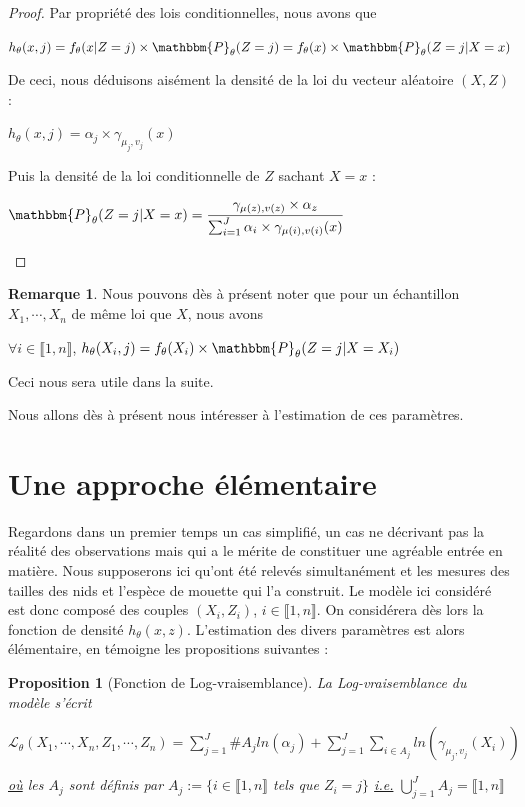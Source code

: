 \documentclass[frenchb]{report}
\newcommand{\1}{\mathbbm{1}}
\newcommand{\prob}{\mathbbm{P}}
\newtheorem{prop}{Proposition}
\theoremstyle{definition}\newtheorem{defn}{Définition}
\theoremstyle{definition}\newtheorem{exm}{Exemple}
\theoremstyle{definition}\newtheorem{nota}{Notation}
\theoremstyle{definition}\newtheorem{rem}{Remarque}
\begin{document}
\begin{proof}
Par propriété des lois conditionnelles, nous avons que  
\begin{center} $h_\theta(x,j) = f_\theta(x | Z = j)\times \prob_\theta(Z = j) = f_\theta(x)\times\prob_\theta(Z = j | X = x)$ \end{center}
De ceci, nous déduisons aisément la densité de la loi du vecteur aléatoire $(X,Z)$ : 
\begin{center} $h_\theta(x,j) = \alpha_j\times\gamma_{\mu_j, v_j}(x)$ \end{center}
Puis la densité de la loi conditionnelle de $Z$ sachant $X = x$ :
\begin{center}
$\prob_\theta(Z = j | X = x)=\displaystyle \frac{\gamma_{\mu(z),v(z)}\times\alpha_z}{\sum_{i=1}^J \alpha_i \times \gamma_{\mu(i), v(i)}(x)}$
\end{center}
\end{proof}

\begin{rem}
Nous pouvons dès à présent noter que pour un échantillon $X_1, \cdots, X_n$ de même loi que $X$, nous avons 
\begin{center}
$\forall i \in \llbracket 1,n \rrbracket$, $h_\theta(X_i,j) = f_\theta(X_i) \times \prob_\theta(Z = j | X = X_i )$
\end{center}
Ceci nous sera utile dans la suite.
\end{rem}

Nous allons dès à présent nous intéresser à l'estimation de ces paramètres.

\section{Une approche élémentaire}

Regardons dans un premier temps un cas simplifié, un cas ne décrivant pas la réalité des observations mais qui a le mérite de constituer une agréable entrée en matière. \newline
Nous supposerons ici qu'ont été relevés simultanément et les mesures des tailles des nids et l'espèce de mouette qui l'a construit. Le modèle ici considéré est donc composé des couples $(X_i, Z_i)$, $i \in \llbracket1,n \rrbracket$. On considérera dès lors la fonction de densité $h_\theta(x,z)$.\newline
L'estimation des divers paramètres est alors élémentaire, en témoigne les propositions suivantes :
\begin{prop}[Fonction de Log-vraisemblance]
La Log-vraisemblance du modèle s'écrit
\begin{center} $\mathcal{L}_\theta(X_1, \cdots, X_n, Z_1, \cdots, Z_n) = \displaystyle \sum_{j=1}^J \#A_j ln(\alpha_j) + \sum_{j=1}^J\sum_{i\in A_j}ln(\gamma_{\mu_j, v_j}(X_i))$ \end{center}
\underline{où} les $A_j$ sont définis par $A_j := \{ i\in \llbracket1,n \rrbracket$ tels que $Z_i = j \}$ \underline{i.e.} $\displaystyle\bigcup_{j=1}^J A_j = \llbracket1,n \rrbracket$
\end{prop}
\end{document}
